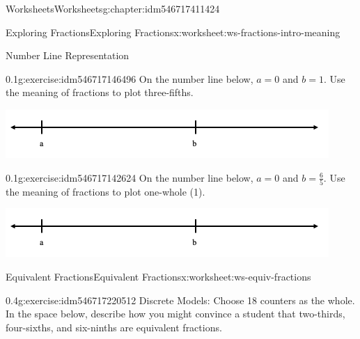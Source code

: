 \documentclass[twoside,11pt,]{book}
\begin{document}
\begin{chapterptx}{Worksheets}{}{Worksheets}{}{}{g:chapter:idm546717411424}
\begin{worksheet-section-numberless}{Exploring Fractions}{}{Exploring Fractions}{}{}{x:worksheet:ws-fractions-intro-meaning}
\begin{introduction}{}%
Number Line Representation%
\end{introduction}%
\begin{divisionexercise}{9}{}{0.1}{g:exercise:idm546717146496}%
On the number line below, \(a= 0 \) and \(b=1 \).  Use the meaning of fractions to plot three-fifths.%
\begin{sidebyside}{1}{0}{0}{0}%
\begin{sbspanel}{1}%
\includegraphics[width=1\linewidth]{images/fractions-number-line.png}
\end{sbspanel}%
\end{sidebyside}%
\end{divisionexercise}%
\clearpage
\begin{divisionexercise}{10}{}{0.1}{g:exercise:idm546717142624}%
On the number line below, \(a= 0 \) and \(b=\frac{6}{5} \).  Use the meaning of fractions to plot one-whole (1).%
\begin{sidebyside}{1}{0}{0}{0}%
\begin{sbspanel}{1}%
\includegraphics[width=1\linewidth]{images/fractions-number-line.png}
\end{sbspanel}%
\end{sidebyside}%
\end{divisionexercise}%
\end{worksheet-section-numberless}
\restoregeometry
%
%
\typeout{************************************************}
\typeout{************************************************}
%
\begin{worksheet-section-numberless}{Equivalent Fractions}{}{Equivalent Fractions}{}{}{x:worksheet:ws-equiv-fractions}
\begin{divisionexercise}{1}{}{0.4}{g:exercise:idm546717220512}%
Discrete Models: Choose 18 counters as the whole. In the space below, describe how you might convince a student that two-thirds, four-sixths, and six-ninths are equivalent fractions.%

\end{divisionexercise}
\end{worksheet-section-numberless}
\end{chapterptx}
\end{document}
